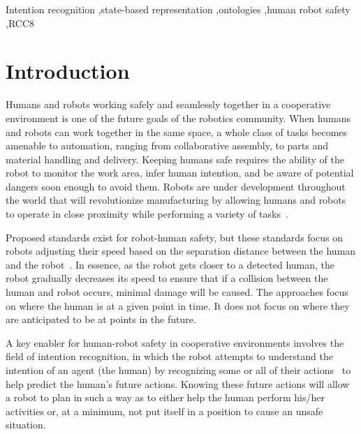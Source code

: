 \documentclass[preprint,12pt]{elsarticle}
\begin{document}
\begin{frontmatter}
\begin{keyword}
Intention recognition \sep state-based representation \sep ontologies \sep human robot safety \sep RCC8

\end{keyword}

\end{frontmatter}


\section{Introduction}
\label{S:INTRO}

Humans and robots working safely and seamlessly together in a cooperative environment is one of the future goals of the robotics community. When humans and robots can work together in the same space, a whole class of tasks becomes amenable to automation, ranging from collaborative assembly, to parts and material handling and delivery. Keeping humans safe requires the ability of the robot to monitor the work area, infer human intention, and be aware of potential dangers soon enough to avoid them. Robots are under development throughout the world that will revolutionize manufacturing by allowing humans and robots to operate in close proximity while performing a variety of tasks~\cite{SZABO.2011}.

Proposed standards exist for robot-human safety, but these standards focus on robots adjusting their speed based on the separation distance between the human and the robot~\cite{CHABROL.1987}. In essence, as the robot gets closer to a detected human, the robot gradually decreases its speed to ensure that if a collision between the human and robot occurs, minimal damage will be caused. The approaches focus on where the human is at a given point in time. It does not focus on where they are anticipated to be at points in the future.

A key enabler for human-robot safety in cooperative environments involves the field of intention recognition, in which the robot attempts to understand the intention of an agent (the human) by recognizing some or all of their actions~\cite{SADRI.2011} to help predict the human's future actions. Knowing these future actions will allow a robot to plan in such a way as to either help the human perform his/her activities or, at a minimum, not put itself in a position to cause an unsafe situation.
\end{document}
